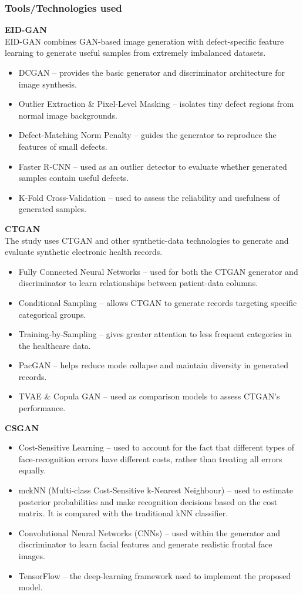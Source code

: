 \documentclass[12pt,a4paper]{article}
\begin{document}
\subsubsection{Tools/Technologies used}
\textbf{EID-GAN} \\
EID-GAN combines GAN-based image generation with defect-specific feature learning to generate useful samples from extremely imbalanced datasets.
\begin{itemize}
    \item DCGAN – provides the basic generator and discriminator architecture for image synthesis.
    \item Outlier Extraction \& Pixel-Level Masking – isolates tiny defect regions from normal image backgrounds.
    \item Defect-Matching Norm Penalty – guides the generator to reproduce the features of small defects.
    \item Faster R-CNN – used as an outlier detector to evaluate whether generated samples contain useful defects.
    \item K-Fold Cross-Validation – used to assess the reliability and usefulness of generated samples.
\end{itemize}
\textbf{CTGAN} \\
The study uses CTGAN and other synthetic-data technologies to generate and evaluate synthetic electronic health records.
\begin{itemize}
    \item Fully Connected Neural Networks – used for both the CTGAN generator and discriminator to learn relationships between patient-data columns.
    \item Conditional Sampling – allows CTGAN to generate records targeting specific categorical groups.
    \item Training-by-Sampling – gives greater attention to less frequent categories in the healthcare data.
    \item PacGAN – helps reduce mode collapse and maintain diversity in generated records.
    \item TVAE \& Copula GAN – used as comparison models to assess CTGAN's performance.
\end{itemize}
\textbf{CSGAN}
\begin{itemize}
    \item Cost-Sensitive Learning – used to account for the fact that different types of face-recognition errors have different costs, rather than treating all errors equally.
    \item mckNN (Multi-class Cost-Sensitive k-Nearest Neighbour) – used to estimate posterior probabilities and make recognition decisions based on the cost matrix. It is compared with the traditional kNN classifier.
    \item Convolutional Neural Networks (CNNs) – used within the generator and discriminator to learn facial features and generate realistic frontal face images.
    \item TensorFlow – the deep-learning framework used to implement the proposed model.
\end{itemize}
\end{document}
